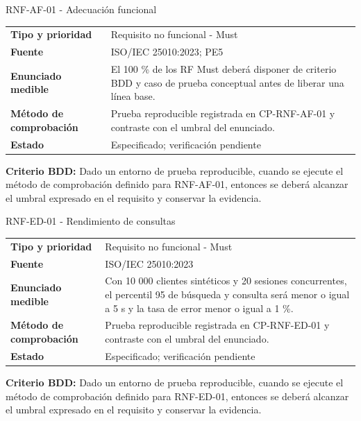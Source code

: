 
\begin{reqbox}[colframe=Teal]{RNF-AF-01 - Adecuación funcional}
\begin{tabularx}{\textwidth}{>{\bfseries}p{3.2cm}Y}
Tipo y prioridad & Requisito no funcional - Must \\
Fuente & ISO/IEC 25010:2023; PE5 \\
Enunciado medible & El 100 \% de los RF Must deberá disponer de criterio BDD y caso de prueba conceptual antes de liberar una línea base. \\
Método de comprobación & Prueba reproducible registrada en CP-RNF-AF-01 y contraste con el umbral del enunciado. \\
Estado & Especificado; verificación pendiente \\
\end{tabularx}
\textbf{Criterio BDD:} Dado un entorno de prueba reproducible, cuando se ejecute el método de comprobación definido para RNF-AF-01, entonces se deberá alcanzar el umbral expresado en el requisito y conservar la evidencia.
\end{reqbox}


\begin{reqbox}[colframe=Teal]{RNF-ED-01 - Rendimiento de consultas}
\begin{tabularx}{\textwidth}{>{\bfseries}p{3.2cm}Y}
Tipo y prioridad & Requisito no funcional - Must \\
Fuente & ISO/IEC 25010:2023 \\
Enunciado medible & Con 10 000 clientes sintéticos y 20 sesiones concurrentes, el percentil 95 de búsqueda y consulta será menor o igual a 5 s y la tasa de error menor o igual a 1 \%. \\
Método de comprobación & Prueba reproducible registrada en CP-RNF-ED-01 y contraste con el umbral del enunciado. \\
Estado & Especificado; verificación pendiente \\
\end{tabularx}
\textbf{Criterio BDD:} Dado un entorno de prueba reproducible, cuando se ejecute el método de comprobación definido para RNF-ED-01, entonces se deberá alcanzar el umbral expresado en el requisito y conservar la evidencia.
\end{reqbox}


